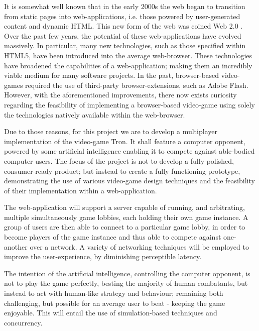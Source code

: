 \documentclass{standalone}
\begin{document}
	It is somewhat well known that in the early 2000s the web began to transition from static pages into web-applications, i.e. those powered by user-generated content and dynamic HTML. This new form of the web was coined Web 2.0 \parencite{Web20}. Over the past few years, the potential of these web-applications have evolved massively. In particular, many new technologies, such as those specified within HTML5, have been introduced into the average web-browser. These technologies have broadened the capabilities of a web-application; making them an incredibly viable medium for many software projects. In the past, browser-based video-games required the use of third-party browser-extensions, such as Adobe Flash. However, with the aforementioned improvements, there now exists curiosity regarding the feasibility of implementing a browser-based video-game using solely the technologies natively available within the web-browser.

	Due to those reasons, for this project we are to develop a multiplayer implementation of the video-game Tron. It shall feature a computer opponent, powered by some artificial intelligence enabling it to compete against able-bodied computer users. The focus of the project is not to develop a fully-polished, consumer-ready product; but instead to create a fully functioning prototype, demonstrating the use of various video-game design techniques and the feasibility of their implementation within a web-application. 

	The web-application will support a server capable of running, and arbitrating, multiple simultaneously game lobbies, each holding their own game instance. A group of users are then able to connect to a particular game lobby, in order to become players of the game instance and thus able to compete against one-another over a network. A variety of networking techniques will be employed to improve the user-experience, by diminishing  perceptible latency.

	The intention of the artificial intelligence, controlling the computer opponent, is not to play the game perfectly, besting the majority of human combatants, but instead to act with human-like strategy and behaviour; remaining both challenging, but possible for an average user to beat - keeping the game enjoyable. This will entail the use of simulation-based techniques and concurrency.
\end{document}
